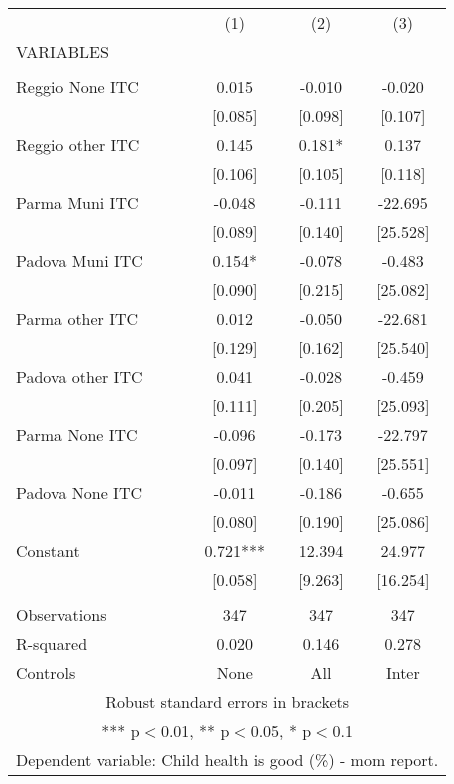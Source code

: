 \begin{tabular}{lccc} \hline
 & (1) & (2) & (3) \\
VARIABLES &  &  &  \\ \hline
 &  &  &  \\
Reggio None ITC & 0.015 & -0.010 & -0.020 \\
 & [0.085] & [0.098] & [0.107] \\
Reggio other ITC & 0.145 & 0.181* & 0.137 \\
 & [0.106] & [0.105] & [0.118] \\
Parma Muni ITC & -0.048 & -0.111 & -22.695 \\
 & [0.089] & [0.140] & [25.528] \\
Padova Muni ITC & 0.154* & -0.078 & -0.483 \\
 & [0.090] & [0.215] & [25.082] \\
Parma other ITC & 0.012 & -0.050 & -22.681 \\
 & [0.129] & [0.162] & [25.540] \\
Padova other ITC & 0.041 & -0.028 & -0.459 \\
 & [0.111] & [0.205] & [25.093] \\
Parma None ITC & -0.096 & -0.173 & -22.797 \\
 & [0.097] & [0.140] & [25.551] \\
Padova None ITC & -0.011 & -0.186 & -0.655 \\
 & [0.080] & [0.190] & [25.086] \\
Constant & 0.721*** & 12.394 & 24.977 \\
 & [0.058] & [9.263] & [16.254] \\
 &  &  &  \\
Observations & 347 & 347 & 347 \\
R-squared & 0.020 & 0.146 & 0.278 \\
 Controls & None & All & Inter \\ \hline
\multicolumn{4}{c}{ Robust standard errors in brackets} \\
\multicolumn{4}{c}{ *** p$<$0.01, ** p$<$0.05, * p$<$0.1} \\
\multicolumn{4}{c}{ Dependent variable: Child health is good (\%) - mom report.} \\
\end{tabular}
